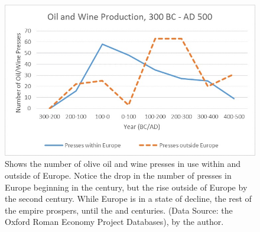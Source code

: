 	\begin{figure}[!p]
		\includegraphics[width=\linewidth]{figures/Davis_Agroeconomy_Fig11.jpg}
		\centering
		\caption{Shows the number of olive oil and wine presses in use within and outside of Europe. Notice the drop in the number of presses in Europe beginning in the  century, but the rise outside of Europe by the second century. While Europe is in a state of decline, the rest of the empire prospers, until the  and  centuries. (Data Source: the Oxford Roman Economy Project Databases), by the author.}
		\label{fig:DavisFig11}
	\end{figure}
\clearpage	
\myseparator
